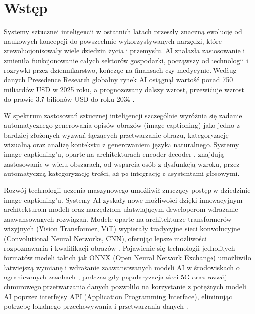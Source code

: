 \newpage %
\section{Wstęp}\label{s:Wstep}

\noindent
Systemy sztucznej inteligencji w ostatnich latach przeszły znaczną ewolucję od naukowych koncepcji
do powszechnie wykorzystywanych narzędzi, które zrewolucjonizowały wiele dziedzin życia i przemysłu.
AI znalazła zastosowanie i zmieniła funkcjonowanie całych sektorów gospodarki, począwszy od technologii i
rozrywki przez dziennikarstwo, kończąc na finansach czy medycynie. Według danych Presedence Research globalny rynek AI
osiągnął wartość ponad 750 miliardów USD w 2025 roku, a prognozowany dalszy wzrost, przewiduje wzrost
do prawie 3.7 bilionów USD do roku 2034 \cite{ai_market_precedence_2025}.

W spektrum zastosowań sztucznej inteligencji szczególnie wyróżnia się zadanie automatycznego generowania
opisów obrazów (image captioning) jako jedno z bardziej złożonych wyzwań łączących przetwarzanie obrazu,
kategoryzację wizualną oraz analizę kontekstu z generowaniem języka naturalnego. Systemy image captioning'u,
oparte na architekturach encoder-decoder \cite{show_and_tell_vinyals2015}, znajdują zastosowanie w wielu obszarach,
od wsparcia osób z dysfunkcją wzroku, przez automatyczną kategoryzację treści, aż po integrację
z asystentami głosowymi.

Rozwój technologii uczenia maszynowego umożliwił znaczący postęp w dziedzinie image captioning'u.
Systemy AI zyskały nowe możliwości dzięki innowacyjnym architekturom modeli oraz narzędziom
ułatwiającym deweloperom wdrażanie zaawansowanych rozwiązań.
Modele oparte na architekturze transformerów wizyjnych (Vision Transformer, ViT)
wypierały tradycyjne sieci konwolucyjne (Convolutional Neural Networks, CNN), oferując lepsze możliwości 
rozpoznawania i kwalifikacji obrazów \cite{vit_dosovitskiy2021}. Pojawienie się technologii jednolitych 
formatów modeli takich jak ONNX (Open Neural Network Exchange) umożliwiło łatwiejszą wymianę i wdrażanie 
zaawansowanych modeli AI w środowiskach o ograniczonych zasobach \cite{onnx_icsme_openja2022}, podczas gdy 
popularyzacja sieci 5G oraz rozwój chmurowego przetwarzania danych pozwoliło na korzystanie z potężnych
modeli AI poprzez interfejsy API (Application Programming Interface), eliminując potrzebę lokalnego przechowywania
i przetwarzania danych \cite{edge_computing_shi2016}.

